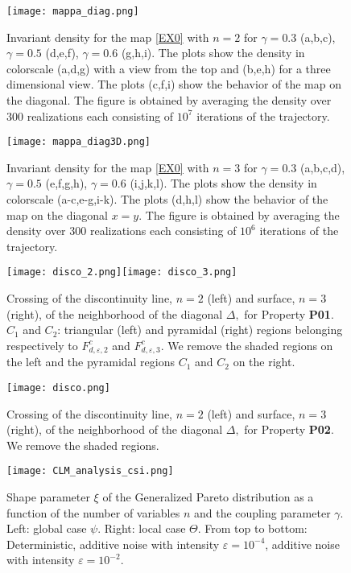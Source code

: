 \documentclass[12pt,reqno,a4paper]{amsart}
\let\epsilon\varepsilon
\begin{document}
\clearpage

\begin{figure}[t]
\texttt{[image: mappa\_diag.png]}
\caption{Invariant density for the map \ref{EX0} with $n=2$ for $\gamma=0.3$ (a,b,c),  $\gamma=0.5$ (d,e,f), $\gamma=0.6$ (g,h,i). The plots show the density in colorscale (a,d,g) with a view from the top and (b,e,h) for a three dimensional view. The plots (c,f,i) show the behavior of the map on the diagonal. The figure is obtained by averaging the density over 300 realizations each consisting of $10^7$ iterations of the trajectory.}
\label{dens1}
\end{figure}

\begin{figure}[t]
\texttt{[image: mappa\_diag3D.png]}
\caption{Invariant density for the map \ref{EX0} with $n=3$ for $\gamma=0.3$ (a,b,c,d),  $\gamma=0.5$ (e,f,g,h), $\gamma=0.6$ (i,j,k,l). The plots show the density in colorscale (a-c,e-g,i-k). The plots (d,h,l) show the behavior of the map on the diagonal $x=y$. The figure is obtained by averaging the density over 300 realizations each consisting of $10^6$ iterations of the trajectory.}
\label{dens}
\end{figure}


\begin{figure}[t]
\texttt{[image: disco\_2.png]}\texttt{[image: disco\_3.png]}
\caption{Crossing of the discontinuity line, $n=2$ (left)  and surface, $n=3$ (right),  of the neighborhood of the diagonal $\Delta,$ for Property {\bf P01}. $C_1$ and $C_2$: triangular (left) and pyramidal (right) regions belonging respectively to $F^c_{d, \varepsilon, 2}$ and $F^c_{d, \varepsilon, 3}$. We remove the shaded regions on the left and the pyramidal regions $C_1$ and $C_2$ on the right.}
\label{DIPO}
\end{figure}

\begin{figure}[t]
\texttt{[image: disco.png]}
\caption{Crossing of the discontinuity line, $n=2$ (left)  and surface, $n=3$ (right),  of the neighborhood of the diagonal $\Delta,$ for  Property {\bf P02}. We remove the shaded regions.}
\label{DIS}
\end{figure}




\begin{figure}[t]
\texttt{[image: CLM\_analysis\_csi.png]}
\caption{Shape parameter $\xi$ of the Generalized Pareto distribution as a function of the number of variables $n$ and the coupling parameter $\gamma$. Left: global case $\psi$. Right: local case $\Theta$. From top to bottom: Deterministic, additive noise with intensity $\epsilon=10^{-4}$, additive noise with intensity $\epsilon=10^{-2}$.}
\label{CLM_csi}
\end{figure}
\end{document}
